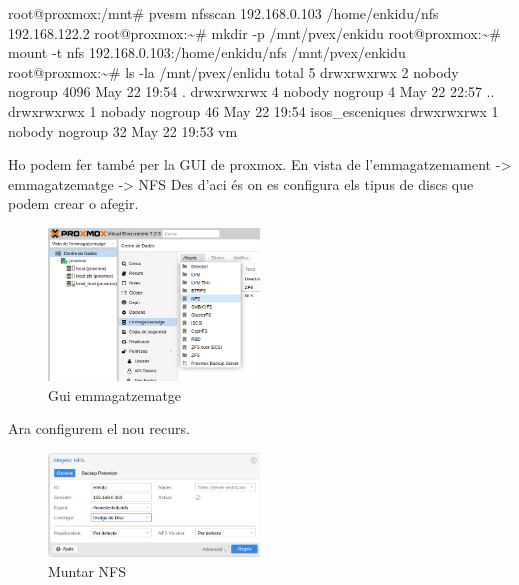 \documentclass[
  10pt,
]{krantz}
\newenvironment{Shaded}{\begin{snugshade}}{\end{snugshade}}
\newcommand{\AttributeTok}[1]{\textcolor[rgb]{0.77,0.63,0.00}{#1}}
\newcommand{\ExtensionTok}[1]{#1}
\newcommand{\NormalTok}[1]{#1}
\begin{document}
\begin{Shaded}
\begin{Highlighting}[]
\ExtensionTok{root@proxmox:/mnt\#}\NormalTok{ pvesm nfsscan 192.168.0.103}
\ExtensionTok{/home/enkidu/nfs}\NormalTok{ 192.168.122.2}
\ExtensionTok{root@proxmox:\textasciitilde{}\#}\NormalTok{ mkdir }\AttributeTok{{-}p}\NormalTok{ /mnt/pvex/enkidu}
\ExtensionTok{root@proxmox:\textasciitilde{}\#}\NormalTok{ mount }\AttributeTok{{-}t}\NormalTok{ nfs 192.168.0.103:/home/enkidu/nfs /mnt/pvex/enkidu}
\ExtensionTok{root@proxmox:\textasciitilde{}\#}\NormalTok{ ls }\AttributeTok{{-}la}\NormalTok{  /mnt/pvex/enlidu}
\ExtensionTok{total}\NormalTok{ 5}
\ExtensionTok{drwxrwxrwx}\NormalTok{ 2 nobody nogroup 4096 May 22 19:54 .}
\ExtensionTok{drwxrwxrwx}\NormalTok{ 4 nobody nogroup    4 May 22 22:57 ..}
\ExtensionTok{drwxrwxrwx}\NormalTok{ 1 nobady nogroup   46 May 22 19:54 isos\_esceniques}
\ExtensionTok{drwxrwxrwx}\NormalTok{ 1 nobody nogroup   32 May 22 19:53 vm}
\end{Highlighting}
\end{Shaded}

Ho podem fer també per la GUI de proxmox. En vista de l'emmagatzemament -\textgreater{} emmagatzematge -\textgreater{} NFS Des d'aci és on es configura els tipus de discs que podem crear o afegir.

\begin{figure}
\centering
\includegraphics[width=0.5\textwidth,height=\textheight]{imatges/proxmox/proxmox_enmag.png}
\caption{Gui emmagatzematge}
\end{figure}

Ara configurem el nou recurs.

\begin{figure}
\centering
\includegraphics[width=0.5\textwidth,height=\textheight]{imatges/proxmox/proxmox_emn2.png}
\caption{Muntar NFS}
\end{figure}
\end{document}

